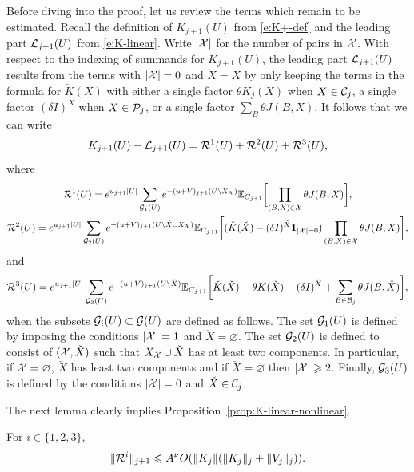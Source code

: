 \documentclass[11pt]{amsart}
\numberwithin{equation}{section}
\numberwithin{theorem}{section}
\newcommand{\1}{{\bf 1}}
\begin{document}
Before diving into the proof, let us review the terms which remain to
be estimated. Recall the definition of $K_{j+1}(U)$ from
\eqref{e:K+-def} and the leading part $\mathcal L_{j+1}(U)$ from
\eqref{e:K-linear}. Write $|\mathcal X|$ for the number of pairs in $\mathcal X$.
With respect to the indexing of summands for $K_{j+1}(U)$, the leading
part $\mathcal L_{j+1}(U)$ results from the terms with $|\mathcal X|=0$ and
$\check X=X$ by only keeping the terms in the formula for
$\check{K}(X)$ with either a single factor $\theta K_j(X)$ when
$X\in\mathcal C_j$, a single factor $(\delta I)^X$ when $X\in \mathcal P_j$, or a
single factor $\sum_B \theta J(B,X)$.  It follows that we can write
\begin{equation} \label{e:KminuscL}
  K_{j+1}(U)-\mathcal{L}_{j+1}(U)
  = \mathcal R^1(U) + \mathcal R^2(U) + \mathcal R^3(U)
    ,
\end{equation}
where
\begin{gather}
  \cR^1(U)
  = e^{u_{j+1}|U|} \sum_{\cG_1(U)} e^{-(u+V)_{j+1}(U\setminus X_{\cX})} \E_{C_{j+1}}
    \qbb{
    \prod_{(B,X) \in \cX} \theta J(B,X) },
  \\
  \cR^2(U)
  =e^{u_{j+1}|U|} \sum_{\cG_2(U)}
  e^{-(u+V)_{j+1}(U \setminus \check X \cup X_{\cX})} \E_{C_{j+1}}
  \qbb{
  (\check{K}(\check{X})-(\delta I)^{\check X}\1_{|\cX|=0})
  \prod_{(B,X)\in\cX}\theta J(B,X)},
\end{gather}
and
\begin{equation}
  \mathcal R^3(U)
  =e^{u_{j+1}|U|} \sum_{\mathcal G_3(U)}
  e^{-(u+V)_{j+1}(U \setminus \check X)} \mathbb{E}_{C_{j+1}}
    \biggl[{\check{K}(\check{X}) - \theta K(\check{X}) -(\delta I)^{\check X} + \sum_{B \in \mathcal B_j} \theta J(B,\check{X})}\biggr] ,
\end{equation}
when the subsets $\mathcal G_i(U)\subset \mathcal G(U)$ are defined as follows.  The
set $\mathcal G_1(U)$ is defined by imposing the conditions $|\mathcal X|=1$ and
$\check X = \varnothing$.  The set $\mathcal G_2(U)$ is defined to
  consist of $(\mathcal X, \check{X})$ such that $X_{\mathcal X} \cup \check{X}$ has
  at least two components.  In particular, if $\mathcal X=\varnothing$,
  $\check{X}$ has least two components and if $\check{X}=\varnothing$
  then $|\mathcal X|\geqslant 2$.  Finally, $\mathcal G_3(U)$ is defined by the
  conditions $|\mathcal X|=0$ and $\check{X}\in \mathcal C_j$.

The next lemma clearly implies Proposition~\ref{prop:K-linear-nonlinear}.
\begin{lemma} \label{lem:Ri-bd}
For $i\in \{1, 2, 3\}$, 
\begin{equation}
  \|\mathcal R^i\|_{{j+1}}   \leqslant 
  A^\nu O(\|K_j\|(\|K_j\|_j+\|V_j\|_j)).
\end{equation}
\end{lemma}
\end{document}
